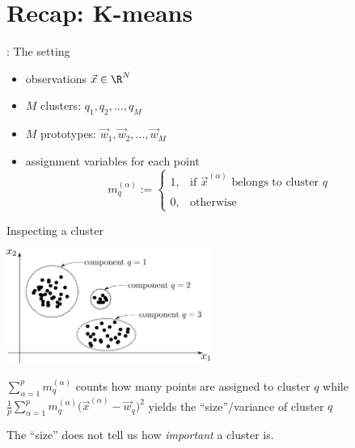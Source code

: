 \section{Recap: K-means}


\begin{frame}{\secname: The setting}

\begin{itemize}
\item[] observations $\vec x \in \R^N$
\item[] $M$ clusters: $q_1, q_2, \ldots, q_M$
\item[] $M$ prototypes: $\vec w_1, \vec w_2, \ldots, \vec w_M$
\item[] assignment variables for each point
\begin{equation}
\label{eq:assignment}
	m_q^{(\alpha)} := \left\{ \begin{array}{ll}
		1, & \text{if } \vec{x}^{(\alpha)} \text{ belongs to cluster } q
		\\\\
		0, & \text{otherwise}
	\end{array} \right. 
\end{equation}

\end{itemize}

\end{frame}

\begin{frame}{Inspecting a cluster}

\begin{center}
	\includegraphics[width=0.5\textwidth]{img/fig1}
\end{center}

$\sum_{\alpha=1}^p m_q^{(\alpha)}$ counts how many points are assigned to cluster $q$ while $\frac{1}{p} \sum_{\alpha=1}^{p}
		m_q^{(\alpha)} \big( \vec{x}^{(\alpha)} - \vec{w}_q \big)^2$ yields the ``size''/variance of cluster $q$
		
\pause

\svspace{5mm}

The ``size'' does not tell us how \textit{important} a cluster is.

\end{frame}

